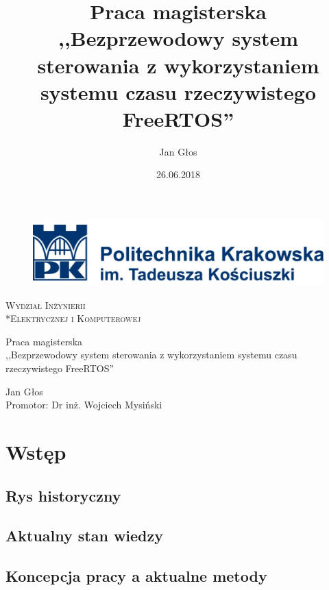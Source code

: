 \documentclass[a4paper, 11pt]{report}
\title{\huge{Praca magisterska\\ ,,Bezprzewodowy system sterowania z wykorzystaniem systemu czasu rzeczywistego FreeRTOS''}}
\author{Jan Głos}
\date{26.06.2018}
\begin{document}
\thispagestyle{empty}
\begin{figure}[t]
\centering
\includegraphics[width=14cm]{files/pk}
\end{figure}
\vspace{8cm}
\begin{Huge}
\begin{center}
\textsc{Wydział Inżynierii \\*Elektrycznej i Komputerowej}
\end{center}
\end{Huge}
\vspace{2cm}
\begin{center}
\begin{huge}
Praca magisterska\\ ,,Bezprzewodowy system sterowania z wykorzystaniem systemu czasu rzeczywistego FreeRTOS''\\
\end{huge}
\vspace{2cm}
\begin{LARGE}
Jan Głos\\

\vspace{5cm}
Promotor: \hfill Dr inż. Wojciech Mysiński
\hfill
\end{LARGE}
\end{center}

\newpage
\begin{small}
\tableofcontents
\end{small}


\newpage

\chapter{Wstęp}
\section{Rys historyczny}
\section{Aktualny stan wiedzy}
\section{Koncepcja pracy a aktualne metody}
\end{document}
